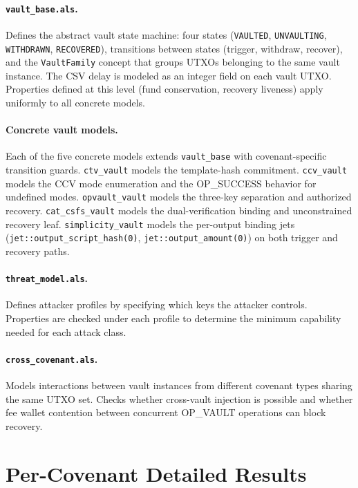 \paragraph{\texttt{vault\_base.als}.}
Defines the abstract vault state machine: four states (\texttt{VAULTED},
\texttt{UNVAULTING}, \texttt{WITHDRAWN}, \texttt{RECOVERED}), transitions between
states (trigger, withdraw, recover), and the \texttt{VaultFamily} concept that groups
UTXOs belonging to the same vault instance. The CSV delay is modeled as an integer
field on each vault UTXO. Properties defined at this level (fund conservation,
recovery liveness) apply uniformly to all concrete models.

\paragraph{Concrete vault models.}
Each of the five concrete models extends \texttt{vault\_base} with
covenant-specific transition guards. \texttt{ctv\_vault} models the
template-hash commitment. \texttt{ccv\_vault} models the CCV mode
enumeration and the OP\_SUCCESS behavior for undefined modes.
\texttt{opvault\_vault} models the three-key separation and
authorized recovery. \texttt{cat\_csfs\_vault} models the
dual-verification binding and unconstrained recovery leaf.
\texttt{simplicity\_vault} models the per-output binding jets
(\texttt{jet::output\_script\_hash(0)}, \texttt{jet::output\_amount(0)})
on both trigger and recovery paths.

\paragraph{\texttt{threat\_model.als}.}
Defines attacker profiles by specifying which keys the attacker controls. Properties
are checked under each profile to determine the minimum capability needed for each
attack class.

\paragraph{\texttt{cross\_covenant.als}.}
Models interactions between vault instances from different covenant types sharing the
same UTXO set. Checks whether cross-vault injection is possible and whether fee
wallet contention between concurrent OP\_VAULT operations can block recovery.

\section{Per-Covenant Detailed Results}

